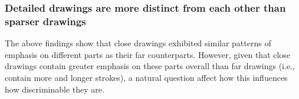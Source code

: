 \documentclass[10pt,letterpaper]{article}
\newcommand{\jefan}[1]{{\color{blue}{[jefan: #1]}}}
\newcommand\norm[1]{\left\lVert#1\right\rVert}
\begin{document}

\subsubsection{Detailed drawings are more distinct from each other than sparser drawings}

The above findings show that close drawings exhibited similar patterns of emphasis on different parts as their far counterparts. 
However, given that close drawings contain greater emphasis on these parts overall than far drawings (i.e., contain more and longer strokes), a natural question affect how this influences how discriminable they are.

\end{document}
